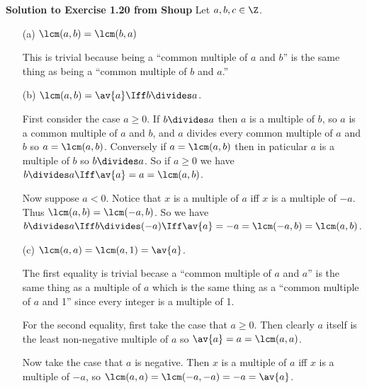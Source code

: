 \documentclass[oneside,12pt]{amsart}
\begin{document}
\textbf{Solution to Exercise 1.20 from Shoup} Let $a,b,c\in\Z$.
\begin{enumerate}
\item[(a)] $\lcm(a,b)=\lcm(b,a)$
\begin{subproof}
This is trivial because being a ``common multiple of $a$ and $b$'' is the same thing
as being a ``common multiple of $b$ and $a$.''
\end{subproof}
\item[(b)] $\lcm(a,b)=\av{a} \Iff b\divides a$.
\begin{subproof}
First consider the case $a\geq 0$.  If $b\divides a$ then $a$ is a multiple of $b$,
so $a$ is a common multiple of $a$ and $b$, and $a$ divides every common multiple of
$a$ and $b$ so $a=\lcm(a,b)$. Conversely if $a=\lcm(a,b)$ then in paticular $a$ is
a multiple of $b$ so $b\divides a$. So if $a\geq 0$ we have 
$b\divides a \Iff \av{a} = a=\lcm(a,b)$.

Now suppose $a<0$. Notice that $x$ is a multiple of $a$ iff $x$ is a multiple of $-a$.
Thus $\lcm(a,b) = \lcm(-a,b)$. So we have
$b\divides a \Iff b\divides (-a) \Iff \av{a} = -a = \lcm(-a,b) = \lcm(a,b)$.
\end{subproof}

\item[(c)] $\lcm(a,a)=\lcm(a,1)=\av{a}$.
\begin{subproof}
The first equality is trivial becase a ``common multiple of $a$ and $a$'' is the same
thing as a multiple of $a$ which is the same thing as a ``common multiple of $a$ and 1'' 
since every integer is a multiple of 1.

For the second equality, first take the case that $a\geq 0$. Then clearly $a$ itself is
the least non-negative multiple of $a$ so $\av{a} = a = \lcm(a,a)$.

Now take the case that $a$ is negative. Then $x$ is a multiple of $a$ iff $x$ is a multiple
of $-a$, so $\lcm(a,a)=\lcm(-a,-a)=-a=\av{a}$.
\end{subproof}

\end{enumerate}
\end{document}
